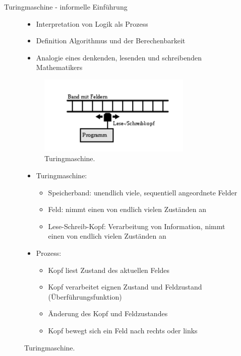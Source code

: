 \documentclass[aspectratio=1610, 9pt]{beamer}
\begin{document}
\begin{frame}{Turingmaschine - informelle Einführung}
  \begin{figure}
    \begin{minipage}{0.49\textwidth}
      \begin{itemize}
        \item Interpretation von Logik als Prozess
        \item Definition Algorithmus und der Berechenbarkeit
        \item Analogie eines denkenden, lesenden und schreibenden Mathematikers
      \end{itemize}
      \begin{figure}
        \includegraphics[width=0.8\textwidth]{images/turing.png}
        \caption{Turingmaschine.}
      \end{figure}
    \end{minipage}
    \hfill
    \begin{minipage}{0.49\textwidth}
      \begin{itemize}
        \item Turingmaschine:
        \begin{itemize}
          \item Speicherband: unendlich viele, sequentiell angeordnete Felder
          \item Feld: nimmt einen von endlich vielen Zuständen an
          \item Lese-Schreib-Kopf: Verarbeitung von Information, nimmt einen von endlich vielen Zuständen an
        \end{itemize}
        \item Prozess:
        \begin{itemize}
          \item Kopf liest Zustand des aktuellen Feldes
          \item Kopf verarbeitet eignen Zustand und Feldzustand \\ (Überführungsfunktion)
          \item Änderung des Kopf und Feldzustandes
          \item Kopf bewegt sich ein Feld nach rechts oder links
        \end{itemize}
      \end{itemize}
    \end{minipage}
  \end{figure}
\end{frame}
\end{document}
